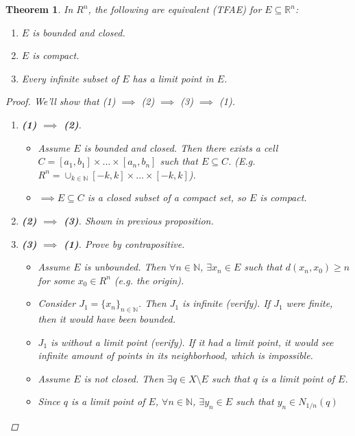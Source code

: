 \documentclass[10pt]{article}
\newcommand{\N}{\mathbb{N}}
\newcommand{\R}{\mathbb{R}}
\newtheorem{theorem}{Theorem}[section]
\theoremstyle{definition}
\theoremstyle{remark}
\begin{document}
\begin{theorem}
    In $R^n$, the following are equivalent (TFAE) for $E \subseteq \R^n$:
    \begin{enumerate}
        \item $E$ is bounded and closed.
        \item $E$ is compact.
        \item Every infinite subset of $E$ has a limit point in $E$.
    \end{enumerate}

    \begin{proof}
        We'll show that (1) $\implies$ (2) $\implies$ (3) $\implies$ (1).
        \begin{enumerate}
            \item
            \textbf{(1) $\implies$ (2)}.
            \begin{itemize}
                \item Assume $E$ is bounded and closed. Then there exists a cell $C = [a_1, b_1] \times \ldots \times [a_n, b_n]$ such that $E \subseteq C$.
                    (E.g. $R^n = \cup_{k \in \N} [-k, k] \times \ldots \times [-k, k]$).
                \item $\implies E \subseteq C$ is a closed subset of a compact set, so $E$ is compact.
            \end{itemize}
        \item 
            \textbf{(2) $\implies$ (3)}. Shown in previous proposition.
        \item 
            \textbf{(3) $\implies$ (1)}. Prove by contrapositive.
            \begin{itemize}
                \item Assume $E$ is unbounded. Then $\forall n \in \N$, $\exists x_n \in E$ such that $d(x_n, x_0) \geq n$ for some $x_0 \in R^n$ (e.g. the origin).
                \item Consider $J_1 = \{x_n\}_{n \in \N}$. Then $J_1$ is infinite (verify). If $J_1$ were finite, then it would have been bounded.
                \item $J_1$ is without a limit point (verify). If it had a limit point, it would see infinite amount of points in its neighborhood, which is impossible.
                \item Assume $E$ is not closed. Then $\exists q \in X \setminus E$ such that $q$ is a limit point of $E$.
                \item Since $q$ is a limit point of $E$, $\forall n \in \N$, $\exists y_n \in E$ such that $y_n \in N_{1/n}(q)$

\end{itemize}
\end{enumerate}
\end{proof}
\end{theorem}
\end{document}

